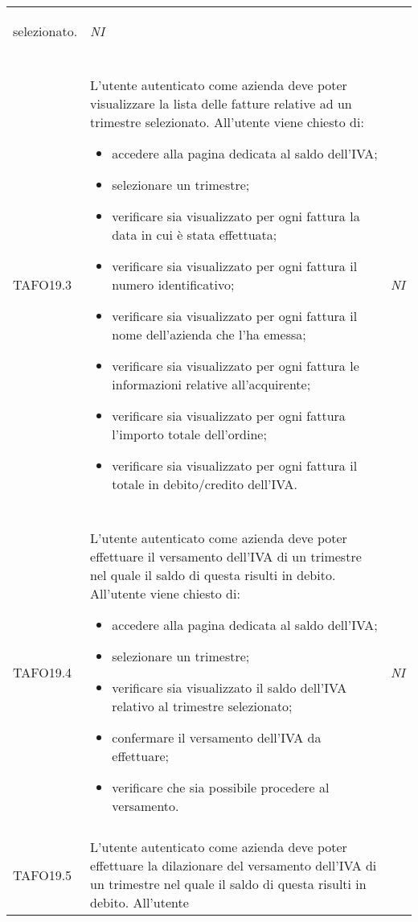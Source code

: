 \begin{longtable}{ >{\centering}p{} >{}p{}
			>{\centering}p{}}
\begin{itemize}
		 	selezionato.
		 \end{itemize} & \textit{NI}\\ \tabularnewline
\hypertarget{TAFO19.3}{TAFO19.3} & L'utente autenticato come azienda deve poter visualizzare la lista delle
		 fatture relative ad un trimestre selezionato. All'utente viene chiesto di:
		 \begin{itemize}
		 	\item accedere alla pagina dedicata al saldo dell'IVA;
		 	\item selezionare un trimestre;
		 	\item verificare sia visualizzato per ogni fattura la data in cui è stata
		 	effettuata;
		 	\item verificare sia visualizzato per ogni fattura il numero identificativo;
		 	\item verificare sia visualizzato per ogni fattura il nome dell'azienda che
		 	l'ha emessa;
		 	\item verificare sia visualizzato per ogni fattura le informazioni relative
		 	all'acquirente;
		 	\item verificare sia visualizzato per ogni fattura l'importo totale
		 	dell'ordine;
		 	\item verificare sia visualizzato per ogni fattura il totale in debito/credito
		 	dell'IVA.
		 \end{itemize} & \textit{NI}\\ \tabularnewline
\hypertarget{TAFO19.4}{TAFO19.4} & L'utente autenticato come azienda deve poter effettuare il versamento 
		 dell'IVA di un trimestre nel quale il saldo di questa risulti in debito. All'utente 
		 viene chiesto di:
		 \begin{itemize}
		 	\item accedere alla pagina dedicata al saldo dell'IVA;
		 	\item selezionare un trimestre;
		 	\item verificare sia visualizzato il saldo dell'IVA relativo al trimestre
		 	selezionato;
		 	\item confermare il versamento dell'IVA da effettuare;
		 	\item verificare che sia possibile procedere al versamento.
		 \end{itemize} & \textit{NI}\\ \tabularnewline
\hypertarget{TAFO19.5}{TAFO19.5} & L'utente autenticato come azienda deve poter effettuare la dilazionare del versamento 
		 dell'IVA di un trimestre nel quale il saldo di questa risulti in debito. All'utente 

\end{longtable}
